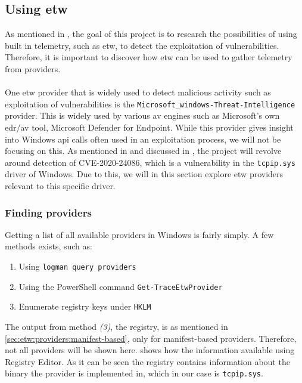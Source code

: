 \documentclass{report}
\begin{document}
\subsection{Using \acrfull{etw}}
\label{cha:etw:constructing-trace-session}
As mentioned in , the goal of this project is to research the possibilities of using built in telemetry, such as \gls{etw}, to detect the exploitation of vulnerabilities. Therefore, it is important to discover how \gls{etw} can be used to gather telemetry from providers.
\\
\\
One \gls{etw} provider that is widely used to detect malicious activity such as exploitation of vulnerabilities is the \texttt{Microsoft_windows-Threat-Intelligence}\cite{url:etw:etwti} provider. This is widely used by various \gls{av} engines such as Microsoft's own \gls{edr}/\gls{av} tool, Microsoft Defender for Endpoint. While this provider gives insight into Windows \gls{api} calls often used in an exploitation process, we will not be focusing on this. As mentioned in  and discussed in , the project will revolve around detection of CVE-2020-24086, which is a vulnerability in the \texttt{tcpip.sys} driver of Windows. Due to this, we will in this section explore \gls{etw} providers relevant to this specific driver.

\subsubsection{Finding providers}
Getting a list of all available providers in Windows is fairly simply. A few methods exists, such as:

\begin{enumerate}
    \item Using \texttt{logman query providers}
    \item Using the PowerShell command \texttt{Get-TraceEtwProvider}
    \item Enumerate registry keys under \texttt{HKLM\SOFTWARE\Microsoft\Windows\CurrentVersion\WINEVT\Publishers}
\end{enumerate}

The output from method \emph{(3)}, the registry, is as mentioned in \autoref{sec:etw:providers:manifest-based}, only for manifest-based providers. Therefore, not all providers will be shown here.  shows how the information available using Registry Editor. As it can be seen the registry contains information about the binary the provider is implemented in, which in our case is \texttt{tcpip.sys}. 
\end{document}
